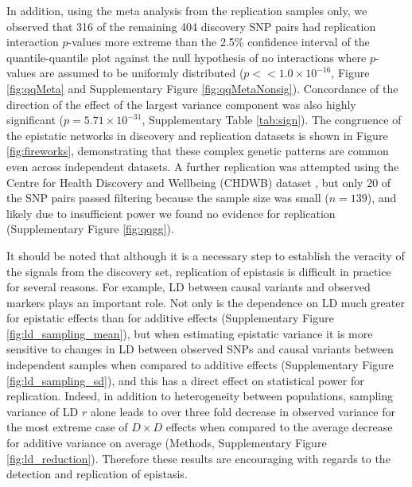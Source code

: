 \documentclass{article}
\begin{document}
In addition, using the meta analysis from the replication samples only, we observed that 316 of the remaining 404 discovery SNP pairs had replication interaction $p$-values more extreme than the 2.5\% confidence interval of the quantile-quantile plot against the null hypothesis of no interactions where $p$-values are assumed to be uniformly distributed ($p << 1.0 \times 10^{-16}$, Figure \ref{fig:qqMeta} and Supplementary Figure \ref{fig:qqMetaNonsig}). Concordance of the direction of the effect of the largest variance component was also highly significant ($p = 5.71 \times 10^{-31}$, Supplementary Table \ref{tab:sign}). The congruence of the epistatic networks in discovery and replication datasets is shown in Figure \ref{fig:fireworks}, demonstrating that these complex genetic patterns are common even across independent datasets. A further replication was attempted using the Centre for Health Discovery and Wellbeing (CHDWB) dataset \cite{Preininger2013}, but only 20 of the SNP pairs passed filtering because the sample size was small ($n=139$), and likely due to insufficient power we found no evidence for replication (Supplementary Figure \ref{fig:qqgg}).

It should be noted that although it is a necessary step to establish the veracity of the signals from the discovery set, replication of epistasis is difficult in practice for several reasons. For example, LD between causal variants and observed markers plays an important role. Not only is the dependence on LD much greater for epistatic effects than for additive effects (Supplementary Figure \ref{fig:ld_sampling_mean}), but when estimating epistatic variance it is more sensitive to changes in LD between observed SNPs and causal variants between independent samples when compared to additive effects (Supplementary Figure \ref{fig:ld_sampling_sd}), and this has a direct effect on statistical power for replication. Indeed, in addition to heterogeneity between populations, sampling variance of LD $r$ alone leads to over three fold decrease in observed variance for the most extreme case of $D \times D$ effects when compared to the average decrease for additive variance on average (Methods, Supplementary Figure \ref{fig:ld_reduction}). Therefore these results are encouraging with regards to the detection and replication of epistasis.
\end{document}
